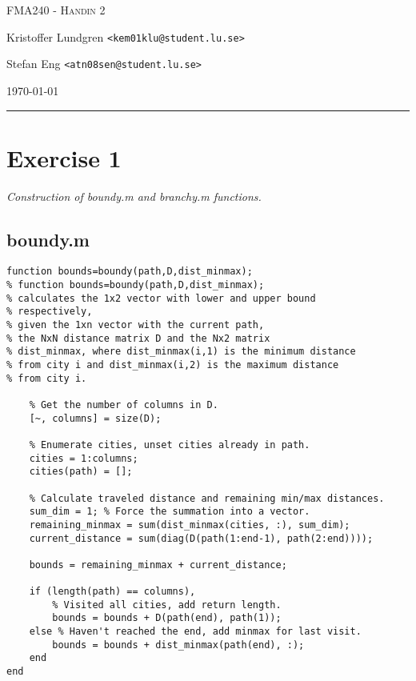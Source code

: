 \documentclass{article}
\begin{document}


\begin{centering}
	{\scshape\Large FMA240 - Handin 2\par}
	\vspace{0.5cm}
	Kristoffer Lundgren \texttt{<kem01klu@student.lu.se>}\par
	Stefan Eng \texttt{<atn08sen@student.lu.se>}\par
    \vspace{0.5cm}
	\today\par
    \rule{\textwidth}{0.4pt}
\end{centering}

\section*{Exercise 1}
  \noindent
  \textit{Construction of boundy.m and branchy.m functions.}

  \subsection*{boundy.m}

  \begin{lstlisting}
function bounds=boundy(path,D,dist_minmax);
% function bounds=boundy(path,D,dist_minmax);
% calculates the 1x2 vector with lower and upper bound
% respectively,
% given the 1xn vector with the current path,
% the NxN distance matrix D and the Nx2 matrix
% dist_minmax, where dist_minmax(i,1) is the minimum distance
% from city i and dist_minmax(i,2) is the maximum distance
% from city i.

    % Get the number of columns in D.
    [~, columns] = size(D);

    % Enumerate cities, unset cities already in path.
    cities = 1:columns;
    cities(path) = [];

    % Calculate traveled distance and remaining min/max distances.
    sum_dim = 1; % Force the summation into a vector.
    remaining_minmax = sum(dist_minmax(cities, :), sum_dim);
    current_distance = sum(diag(D(path(1:end-1), path(2:end))));

    bounds = remaining_minmax + current_distance;

    if (length(path) == columns),
        % Visited all cities, add return length.
        bounds = bounds + D(path(end), path(1));
    else % Haven't reached the end, add minmax for last visit.
        bounds = bounds + dist_minmax(path(end), :);
    end
end
  \end{lstlisting}
\end{document}

